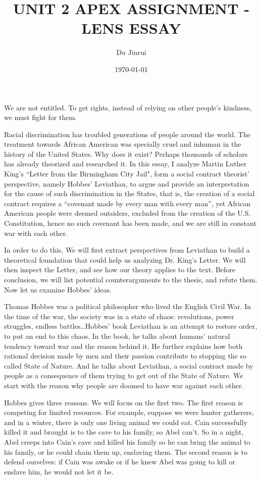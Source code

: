 \documentclass{article}
\title{UNIT 2 APEX ASSIGNMENT - LENS ESSAY}
\author{Du Jinrui}
\date{\today}
\begin{document}
	\maketitle
We are not entitled. To get rights, instead of relying on other people's kindness, we must fight for them.

Racial discrimination has troubled generations of people around the world. The treatment towards African American was specially cruel and inhuman in the history of the United States. Why does it exist? Perhaps thousands of scholars has already theorized and researched it. In this essay, I analyze Martin Luther King's ``Letter from the Birmingham City Jail", form a social contract theorist' perspective, namely Hobbes' Leviathan, to argue and provide an interpretation for the cause of such discrimination in the States, that is, the creation of a social contract requires a “covenant made by every man with every man”, yet African American people were deemed outsiders, excluded from the creation of the U.S. Constitution, hence no such covenant has been made, and we are still in constant war with each other.

In order to do this, We will first extract perspectives from Leviathan to build a theoretical foundation that could help us analyzing Dr. King’s Letter. We will then inspect the Letter, and see how our theory applies to the text. Before conclusion, we will list potential counterarguments to the thesis, and refute them. Now let us examine Hobbes' ideas.

Thomas Hobbes was a political philosopher who lived the English Civil War. In the time of the war, the society was in a state of chaos: revolutions, power struggles, endless battles\ldots Hobbes' book Leviathan is an attempt to restore order, to put an end to this chaos. In the book, he talks about humans' natural tendency toward war and the reason behind it. He further explains how both rational decision made by men and their passion contribute to stopping the so called State of Nature. And he talks about Leviathan, a social contract made by people as a consequence of them trying to get out of the State of Nature. We start with the reason why people are doomed to have war against each other.

Hobbes gives three reasons. We will focus on the first two. The first reason is competing for limited resources. For example, suppose we were hunter gatherers, and in a winter, there is only one living animal we could eat. Cain successfully killed it and brought is to the cave to his family, so Abel can't. So in a night, Abel creeps into Cain's cave and killed his family so he can bring the animal to his family, or he could chain them up, enslaving them. The second reason is to defend ourselves: if Cain was awake or if he knew Abel was going to kill or enslave him, he would not let it be.
\end{document}
